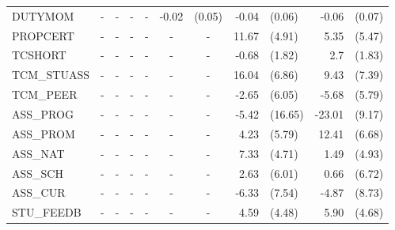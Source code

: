 \documentclass[10pt]{article}
\begin{document}
\begin{table}[htbp]
\begin{tabular}{lrlrlrlrlrl}
      DUTYMOM & \multicolumn{1}{c}{-} & \multicolumn{1}{c}{-} & \multicolumn{1}{c}{-} & \multicolumn{1}{c}{-} & -0.02 & (0.05) & -0.04 & (0.06) & -0.06 & (0.07) \\[0.2em]
      PROPCERT & \multicolumn{1}{c}{-} & \multicolumn{1}{c}{-} & \multicolumn{1}{c}{-} & \multicolumn{1}{c}{-} & \multicolumn{1}{c}{-} & \multicolumn{1}{c}{-} & 11.67 & (4.91) & 5.35  & (5.47) \\[0.2em]
      TCSHORT & \multicolumn{1}{c}{-} & \multicolumn{1}{c}{-} & \multicolumn{1}{c}{-} & \multicolumn{1}{c}{-} & \multicolumn{1}{c}{-} & \multicolumn{1}{c}{-} & -0.68 & (1.82) & 2.7   & (1.83) \\[0.2em]
      TCM\_STUASS & \multicolumn{1}{c}{-} & \multicolumn{1}{c}{-} & \multicolumn{1}{c}{-} & \multicolumn{1}{c}{-} & \multicolumn{1}{c}{-} & \multicolumn{1}{c}{-} & 16.04 & (6.86) & 9.43  & (7.39) \\[0.2em]
      TCM\_PEER & \multicolumn{1}{c}{-} & \multicolumn{1}{c}{-} & \multicolumn{1}{c}{-} & \multicolumn{1}{c}{-} & \multicolumn{1}{c}{-} & \multicolumn{1}{c}{-} & -2.65 & (6.05) & -5.68 & (5.79) \\[0.2em]
      ASS\_PROG & \multicolumn{1}{c}{-} & \multicolumn{1}{c}{-} & \multicolumn{1}{c}{-} & \multicolumn{1}{c}{-} & \multicolumn{1}{c}{-} & \multicolumn{1}{c}{-} & -5.42 & (16.65) & -23.01 & (9.17) \\[0.2em]
      ASS\_PROM & \multicolumn{1}{c}{-} & \multicolumn{1}{c}{-} & \multicolumn{1}{c}{-} & \multicolumn{1}{c}{-} & \multicolumn{1}{c}{-} & \multicolumn{1}{c}{-} & 4.23  & (5.79) & 12.41 & (6.68) \\[0.2em]
      ASS\_NAT & \multicolumn{1}{c}{-} & \multicolumn{1}{c}{-} & \multicolumn{1}{c}{-} & \multicolumn{1}{c}{-} & \multicolumn{1}{c}{-} & \multicolumn{1}{c}{-} & 7.33  & (4.71) & 1.49  & (4.93) \\[0.2em]
      ASS\_SCH & \multicolumn{1}{c}{-} & \multicolumn{1}{c}{-} & \multicolumn{1}{c}{-} & \multicolumn{1}{c}{-} & \multicolumn{1}{c}{-} & \multicolumn{1}{c}{-} & 2.63  & (6.01) & 0.66  & (6.72) \\[0.2em]
      ASS\_CUR & \multicolumn{1}{c}{-} & \multicolumn{1}{c}{-} & \multicolumn{1}{c}{-} & \multicolumn{1}{c}{-} & \multicolumn{1}{c}{-} & \multicolumn{1}{c}{-} & -6.33 & (7.54) & -4.87 & (8.73) \\[0.2em]
      STU\_FEEDB & \multicolumn{1}{c}{-} & \multicolumn{1}{c}{-} & \multicolumn{1}{c}{-} & \multicolumn{1}{c}{-} & \multicolumn{1}{c}{-} & \multicolumn{1}{c}{-} & 4.59  & (4.48) & 5.90  & (4.68) \\[0.2em]

\end{tabular}
\end{table}
\end{document}

